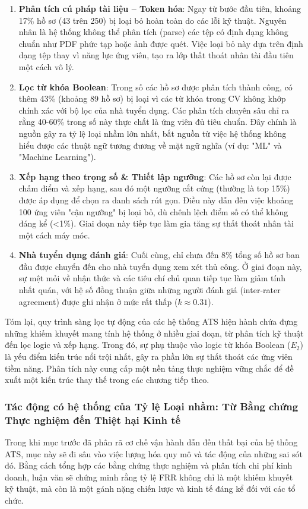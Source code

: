\documentclass{article}
\begin{document}
\begin{enumerate}[topsep=0pt, itemsep=2pt, leftmargin=40pt, label=$E_{\arabic*}$.]
    \item \textbf{Phân tích cú pháp tài liệu – Token hóa}: Ngay từ bước đầu tiên, khoảng 17\% hồ sơ (43 trên 250) bị loại bỏ hoàn toàn do các lỗi kỹ thuật. Nguyên nhân là hệ thống không thể phân tích (parse) các tệp có định dạng không chuẩn như PDF phức tạp hoặc ảnh được quét. Việc loại bỏ này dựa trên định dạng tệp thay vì năng lực ứng viên, tạo ra lớp thất thoát nhân tài đầu tiên một cách vô lý.
    \item \textbf{Lọc từ khóa Boolean}: Trong số các hồ sơ được phân tích thành công, có thêm 43\% (khoảng 89 hồ sơ) bị loại vì các từ khóa trong CV không khớp chính xác với bộ lọc của nhà tuyển dụng. Các phân tích chuyên sâu chỉ ra rằng 40-60\% trong số này thực chất là ứng viên đủ tiêu chuẩn. Đây chính là nguồn gây ra tỷ lệ loại nhầm lớn nhất, bắt nguồn từ việc hệ thống không hiểu được các thuật ngữ tương đương về mặt ngữ nghĩa (ví dụ: "ML" và "Machine Learning").
    \item \textbf{Xếp hạng theo trọng số \& Thiết lập ngưỡng}: Các hồ sơ còn lại được chấm điểm và xếp hạng, sau đó một ngưỡng cắt cứng (thường là top 15\%) được áp dụng để chọn ra danh sách rút gọn. Điều này dẫn đến việc khoảng 100 ứng viên "cận ngưỡng" bị loại bỏ, dù chênh lệch điểm số có thể không đáng kể (<1\%). Giai đoạn này tiếp tục làm gia tăng sự thất thoát nhân tài một cách máy móc.
    \item \textbf{Nhà tuyển dụng đánh giá}: Cuối cùng, chỉ chưa đến 8\% tổng số hồ sơ ban đầu được chuyển đến cho nhà tuyển dụng xem xét thủ công. Ở giai đoạn này, sự mệt mỏi về nhận thức và các tiêu chí chủ quan tiếp tục làm giảm tính nhất quán, với hệ số đồng thuận giữa những người đánh giá (inter-rater agreement) được ghi nhận ở mức rất thấp ($k\approx 0.31$).
\end{enumerate}
Tóm lại, quy trình sàng lọc tự động của các hệ thống ATS hiện hành chứa đựng những khiếm khuyết mang tính hệ thống ở nhiều giai đoạn, từ phân tích kỹ thuật đến lọc logic và xếp hạng. Trong đó, sự phụ thuộc vào logic từ khóa Boolean ($E_2$) là yếu điểm kiến trúc nổi trội nhất, gây ra phần lớn sự thất thoát các ứng viên tiềm năng. Phân tích này cung cấp một nền tảng thực nghiệm vững chắc để đề xuất một kiến trúc thay thế trong các chương tiếp theo.

\subsubsection{Tác động có hệ thống của Tỷ lệ Loại nhầm: Từ Bằng chứng Thực nghiệm đến Thiệt hại Kinh tế}
Trong khi mục trước đã phân rã cơ chế vận hành dẫn đến thất bại của hệ thống ATS, mục này sẽ đi sâu vào việc lượng hóa quy mô và tác động của những sai sót đó. Bằng cách tổng hợp các bằng chứng thực nghiệm và phân tích chi phí kinh doanh, luận văn sẽ chứng minh rằng tỷ lệ FRR không chỉ là một khiếm khuyết kỹ thuật, mà còn là một gánh nặng chiến lược và kinh tế đáng kể đối với các tổ chức.
\end{document}
